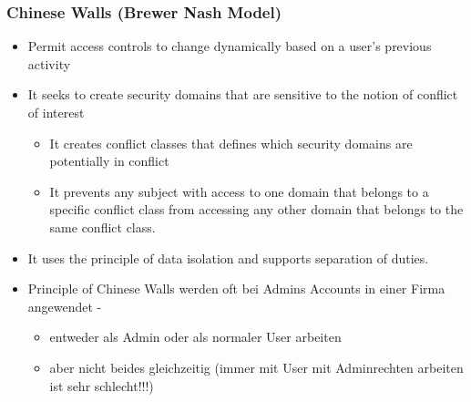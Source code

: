\subsubsection{Chinese Walls (Brewer Nash Model)}
\begin{itemize}
    \item Permit access controls to change dynamically based on a user's previous activity
    \item It seeks to create security domains that are sensitive to the notion of conflict of interest
    \begin{itemize}
        \item It creates conflict classes that defines which security domains are potentially in conflict
        \item It prevents any subject with access to one domain that belongs to a specific conflict class from accessing any other domain that belongs to the same conflict class.
    \end{itemize}
    \item It uses the principle of data isolation and supports separation of duties.
    \item Principle of Chinese Walls werden oft bei Admins Accounts in einer Firma angewendet
    -\begin{itemize}
        \item entweder als Admin oder als normaler User arbeiten
        \item aber nicht beides gleichzeitig (immer mit User mit Adminrechten arbeiten ist sehr schlecht!!!)
    \end{itemize}
\end{itemize}

